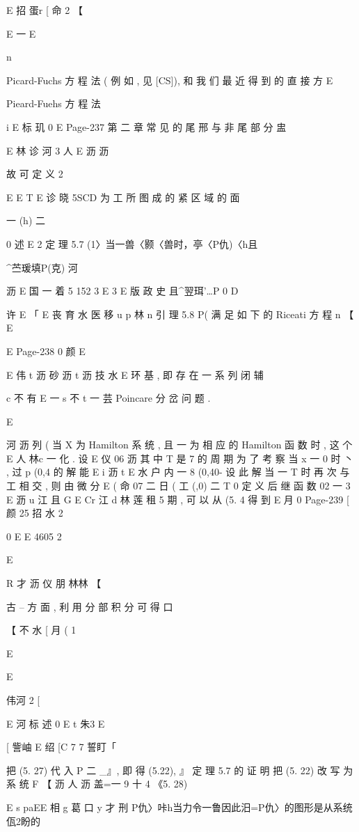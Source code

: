 {{{{{{{{{{{{{{E 招 蛋r [ 命 2 【

E 一
E

n

Picard-Fuchs 方 程 法 ( 例 如 , 见 [CS]), 和 我 们 最 近 得 到 的 直 接 方
E

Pieard-Fuehs 方 程 法

i
E 标 玑 0
E
Page-237
第 二 章 常 见 的 尾 邢 与 非 尾 部 分 盅

E 林 诊 河 3 人
E 沥 沥

故 可 定 义
2

E
E
T
E 诊 晓 5SCD 为 工 所 图 成 的 紧 区 域 的 面

一 (h) 二

0 述
E 2
定 理 5.7 (1〉当一兽〈颢〈兽时，亭〈P仇)〈h且

^苎瑗填P(克) 河

沥 E 国 一 着 5
152 3 E 3 E 版 政 史 且^翌珥'…P 0
D

许
E 「
E 丧 育 水
医 移 u p 林 n
引 理 5.8 P( 满 足 如 下 的 Riceati 方 程
n 【
E

E
Page-238
0 颜 E

E 伟 t 沥 砂 沥 t 沥 技 水 E
环 基 , 即 存 在 一 系 列 闭 辅

c 不 有
E 一
s 不
t 一 芸
Poincare 分 岔 问 题 .

E

河 沥
列 ( 当 X 为 Hamilton 系 统 , 且 一 为 相 应 的 Hamilton 函 数 时 , 这 个
E 人 林c 一
化 . 设
E 仪 06 沥
其 中 T 是 7 的 周 期 为 了 考 察 当 x 一 0 时 丶 , 过 p (0,4 的 解 能
E i 沥 t
E 水
户 内 一 8 (0,40- 设 此 解 当 一 T 时 再 次 与 工 相 交 , 则 由 微 分
E
( 命 07 二 日 ( 工 (,0) 二 T 0
定 义 后 继 函 数
02 一 3
E 沥
u 江
且 G E Cr
江 d 林 莲 租 5
期 , 可 以 从 (5. 4 得 到
E 月 0
Page-239
[ 颜 25 招 水 2

0
E E
4605 2

E

R 才 沥 仪 朋
林林
【

古 -- 方 面 , 利 用 分 部 积 分 可 得
口

【 不 水
[ 月 ( 1

E

E

{ 伟河 2
[

E 河 标 述 0
E
t 朱3
E

[ 訾岫 E 绍
[C 7 7 誓盯「

把 (5. 27) 代 入 P 二 _』, 即 得 (5.22), 』
定 理 5.7 的 证 明 把 (5. 22) 改 写 为 系 统
F 【 沥 人 沥 盖=一 9 十 4 《5. 28)

E s paEE 相 g 葛 口 y 才 刑
P仇〉咔h当力令一鲁因此汨=P仇〉的图形是从系统佤2盼的

}}}}}}}}}}}}}}}
